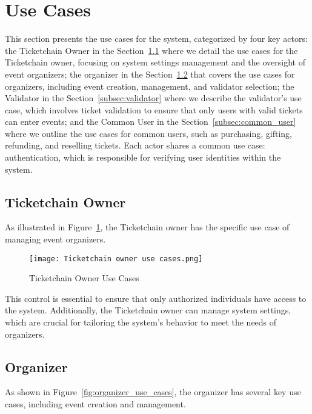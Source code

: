 \section{Use Cases}
\label{sec:use_cases}

This section presents the use cases for the system, categorized by four key
actors: the Ticketchain Owner in the Section~\ref{subsec:ticketchain_owner}
where we detail the use cases for the Ticketchain owner, focusing on system
settings management and the oversight of event organizers; the organizer in the
Section~\ref{subsec:organizer} that covers the use cases for organizers,
including event creation, management, and validator selection; the Validator in
the Section~\ref{subsec:validator} where we describe the validator's use case,
which involves ticket validation to ensure that only users with valid tickets
can enter events; and the Common User in the Section~\ref{subsec:common_user}
where we outline the use cases for common users, such as purchasing, gifting,
refunding, and reselling tickets. Each actor shares a common use case:
authentication, which is responsible for verifying user identities within the
system.

\subsection{Ticketchain Owner}
\label{subsec:ticketchain_owner}

As illustrated in Figure~\ref{fig:ticketchain_owner_use_cases}, the Ticketchain
owner has the specific use case of managing event organizers.

\begin{figure}[H]
    \centering
    \texttt{[image: Ticketchain owner use cases.png]}
    \caption{Ticketchain Owner Use Cases}
    \label{fig:ticketchain_owner_use_cases}
\end{figure}

This control is essential to ensure that only authorized individuals have
access to the system. Additionally, the Ticketchain owner can manage system
settings, which are crucial for tailoring the system’s behavior to meet the
needs of organizers.

\subsection{Organizer}
\label{subsec:organizer}

As shown in Figure~\ref{fig:organizer_use_cases}, the organizer has several key
use cases, including event creation and management.

